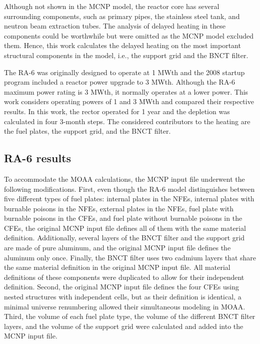 \documentclass{style/nseJournal}
\begin{document}
Although not shown in the MCNP model, the reactor core has several surrounding components, such as primary pipes, the stainless steel tank, and neutron beam extraction tubes.
The analysis of delayed heating in these components could be worthwhile but were omitted as the MCNP model excluded them.
Hence, this work calculates the delayed heating on the most important structural components in the model, i.e., the support grid and the BNCT filter.

The RA-6 was originally designed to operate at 1 MWth and the 2008 startup program included a reactor power upgrade to 3 MWth.
Although the RA-6 maximum power rating is 3 MWth, it normally operates at a lower power.
This work considers operating powers of 1 and 3 MWth and compared their respective results.
In this work, the rector operated for 1 year and the depletion was calculated in four 3-month steps.
The considered contributors to the heating are the fuel plates, the support grid, and the BNCT filter.


\subsection{RA-6 results}

To accommodate the MOAA calculations, the MCNP input file underwent the following modifications.
First, even though the RA-6 model distinguishes between five different types of fuel plates: internal plates in the NFEs, internal plates with burnable poisons in the NFEs, external plates in the NFEs, fuel plate with burnable poisons in the CFEs, and fuel plate without burnable poisons in the CFEs, the original MCNP input file defines all of them with the same material definition.
Additionally, several layers of the BNCT filter and the support grid are made of pure aluminum, and the original MCNP input file defines the aluminum only once.
Finally, the BNCT filter uses two cadmium layers that share the same material definition in the original MCNP input file.
All material definitions of these components were duplicated to allow for their independent definition.
Second, the original MCNP input file defines the four CFEs using nested structures with independent cells, but as their definition is identical, a minimal universe renumbering allowed their simultaneous modeling in MOAA.
Third, the volume of each fuel plate type, the volume of the different BNCT filter layers, and the volume of the support grid were calculated and added into the MCNP input file.
\end{document}
